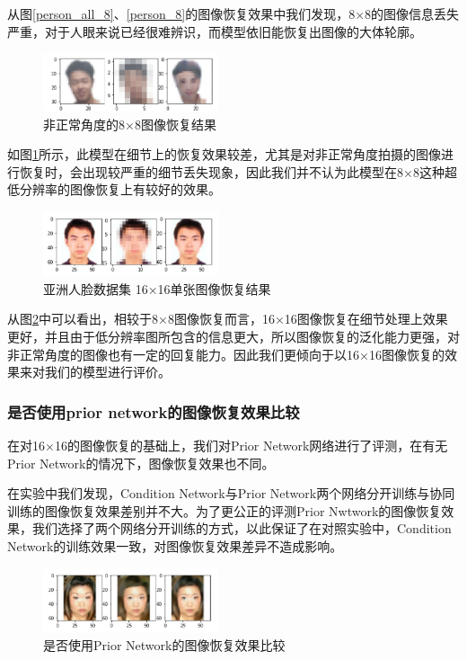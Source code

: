 从图\ref{person_all_8}、\ref{person_8}的图像恢复效果中我们发现，8×8的图像信息丢失严重，对于人眼来说已经很难辨识，而模型依旧能恢复出图像的大体轮廓。

\begin{figure}[htp]
    \centering
    \includegraphics[width=0.46\textwidth]{figures/zzy_8}
    \caption{非正常角度的8×8图像恢复结果}
    \label{zzy_8}
\end{figure}

如图\ref{zzy_8}所示，此模型在细节上的恢复效果较差，尤其是对非正常角度拍摄的图像进行恢复时，会出现较严重的细节丢失现象，因此我们并不认为此模型在8×8这种超低分辨率的图像恢复上有较好的效果。

\begin{figure}[htp]
    \centering
    \includegraphics[width=0.46\textwidth]{figures/person_16}
    \caption{亚洲人脸数据集 16×16单张图像恢复结果}
    \label{person_16}
\end{figure}

从图\ref{person_16}中可以看出，相较于8×8图像恢复而言，16×16图像恢复在细节处理上效果更好，并且由于低分辨率图所包含的信息更大，所以图像恢复的泛化能力更强，对非正常角度的图像也有一定的回复能力。因此我们更倾向于以16×16图像恢复的效果来对我们的模型进行评价。

\subsubsection{是否使用prior network的图像恢复效果比较}
在对16×16的图像恢复的基础上，我们对Prior Network网络进行了评测，在有无Prior Network的情况下，图像恢复效果也不同。

在实验中我们发现，Condition Network与Prior Network两个网络分开训练与协同训练的图像恢复效果差别并不大。为了更公正的评测Prior Nwtwork的图像恢复效果，我们选择了两个网络分开训练的方式，以此保证了在对照实验中，Condition Network的训练效果一致，对图像恢复效果差异不造成影响。

\begin{figure}[htp]
    \centering
    \includegraphics[width=0.46\textwidth]{figures/prior}
    \caption{是否使用Prior Network的图像恢复效果比较}
    \label{prior}
\end{figure}

